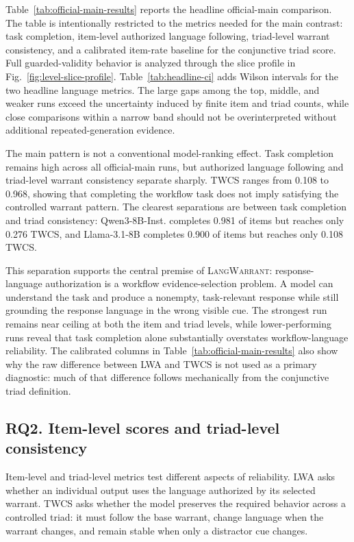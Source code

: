\documentclass[10pt,conference]{IEEEtran}
\newcommand{\dataset}{\textsc{LangWarrant}}
\newcommand{\metric}[1]{\textsc{#1}}
\begin{document}
Table~\ref{tab:official-main-results} reports the headline official-main comparison. The table is intentionally restricted to the metrics needed for the main contrast: task completion, item-level authorized language following, triad-level warrant consistency, and a calibrated item-rate baseline for the conjunctive triad score. Full guarded-validity behavior is analyzed through the slice profile in Fig.~\ref{fig:level-slice-profile}. Table~\ref{tab:headline-ci} adds Wilson intervals for the two headline language metrics. The large gaps among the top, middle, and weaker runs exceed the uncertainty induced by finite item and triad counts, while close comparisons within a narrow band should not be overinterpreted without additional repeated-generation evidence.

The main pattern is not a conventional model-ranking effect. Task completion remains high across all official-main runs, but authorized language following and triad-level warrant consistency separate sharply. \metric{TWCS} ranges from 0.108 to 0.968, showing that completing the workflow task does not imply satisfying the controlled warrant pattern. The clearest separations are between task completion and triad consistency: Qwen3-8B-Inst. completes 0.981 of items but reaches only 0.276 \metric{TWCS}, and Llama-3.1-8B completes 0.900 of items but reaches only 0.108 \metric{TWCS}.

This separation supports the central premise of \dataset{}: response-language authorization is a workflow evidence-selection problem. A model can understand the task and produce a nonempty, task-relevant response while still grounding the response language in the wrong visible cue. The strongest run remains near ceiling at both the item and triad levels, while lower-performing runs reveal that task completion alone substantially overstates workflow-language reliability. The calibrated columns in Table~\ref{tab:official-main-results} also show why the raw difference between LWA and TWCS is not used as a primary diagnostic: much of that difference follows mechanically from the conjunctive triad definition.


\subsection{RQ2. Item-level scores and triad-level consistency}

Item-level and triad-level metrics test different aspects of reliability. \metric{LWA} asks whether an individual output uses the language authorized by its selected warrant. \metric{TWCS} asks whether the model preserves the required behavior across a controlled triad: it must follow the base warrant, change language when the warrant changes, and remain stable when only a distractor cue changes.
\end{document}

